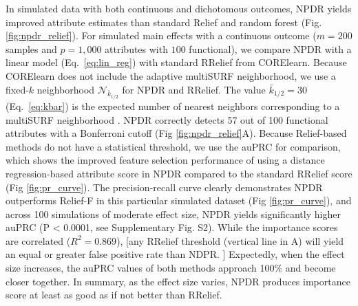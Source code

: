 \documentclass[10pt]{article}
\begin{document}
In simulated data with both continuous and dichotomous outcomes, NPDR yields improved attribute estimates than standard Relief and random forest (Fig. \ref{fig:npdr_relief}). 
For simulated main effects with a continuous outcome ($m = 200$ samples and $p = 1,000$ attributes with $100$ functional), we compare NPDR with a linear model (Eq.~\ref{eq:lin_reg}) with standard RRelief from CORElearn.
Because CORElearn does not include the adaptive multiSURF neighborhood, we use a fixed-$k$ neighborhood $\mathcal{N}_{\bar{k}_{1/2}}$ for NPDR and RRelief.
The value $\bar{k}_{1/2}=30$ (Eq.~\ref{eq:kbar}) is the expected number of nearest neighbors corresponding to a multiSURF neighborhood \cite{bod}. 
NPDR correctly detects 57 out of 100 functional attributes with a Bonferroni cutoff (Fig \ref{fig:npdr_relief}A).
Because Relief-based methods do not have a statistical threshold, we use the auPRC for comparison, which shows the improved feature selection performance of using a distance regression-based attribute score in NPDR compared to the standard RRelief score (Fig \ref{fig:pr_curve}).
The precision-recall curve clearly demonstrates NPDR outperforms Relief-F in this particular simulated dataset (Fig \ref{fig:pr_curve}), and across 100 simulations of moderate effect size, NPDR yields significantly higher auPRC (P < 0.0001, see Supplementary Fig. S2).
While the importance scores are correlated ($R^2 = 0.869$), [any RRelief threshold (vertical line in A) will yield an equal or greater false positive rate than NDPR. ]
Expectedly, when the effect size increases, the auPRC values of both methods approach 100\% and become closer together.
In summary, as the effect size varies, NPDR produces importance score at least as good as if not better than RRelief.
\end{document}

